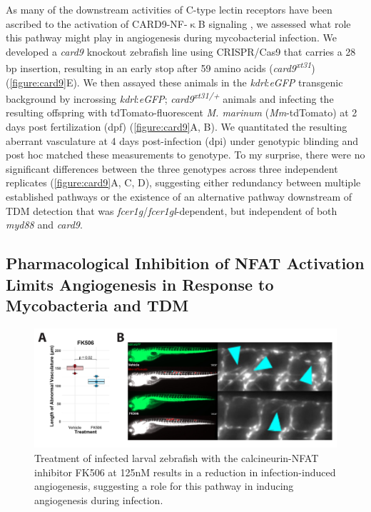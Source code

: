 As many of the downstream activities of C-type lectin receptors have been ascribed to the activation of CARD9-NF-$\upkappa$B signaling \citep{Goodridge2009, LobatoPascual2013, Zhao2014, Williams2017, Deerhake2021}, we assessed what role this pathway might play in angiogenesis during mycobacterial infection. We developed a \textit{card9} knockout zebrafish line using CRISPR/Cas9 that carries a 28 bp insertion, resulting in an early stop after 59 amino acids (\textit{card9\textsuperscript{xt31}}) (\autoref{figure:card9}E). We then assayed these animals in the \textit{kdrl}:\textit{eGFP} transgenic background by incrossing \textit{kdrl}:\textit{eGFP}; \textit{card9\textsuperscript{xt31/+}} animals and infecting the resulting offspring with tdTomato-fluorescent \textit{M. marinum} (\textit{Mm}-tdTomato) at 2 days post fertilization (dpf) \citep{Jin2005, Oehlers2015}(\autoref{figure:card9}A, B). We quantitated the resulting aberrant vasculature at 4 days post-infection (dpi) under genotypic blinding and post hoc matched these measurements to genotype. To my surprise, there were no significant differences between the three genotypes across three independent replicates (\autoref{figure:card9}A, C, D), suggesting either redundancy between multiple established pathways or the existence of an alternative pathway downstream of TDM detection that was \textit{fcer1g}/\textit{fcer1gl}-dependent, but independent of both \textit{myd88} and \textit{card9}. 

\subsection{Pharmacological Inhibition of NFAT Activation Limits Angiogenesis in Response to Mycobacteria and TDM}

\begin{figure}
\centering
\includegraphics[width=\textwidth]{images/fk506inf.pdf}
\caption{Treatment of infected larval zebrafish with the calcineurin-NFAT inhibitor FK506 at 125nM results in a reduction in infection-induced angiogenesis, suggesting a role for this pathway in inducing angiogenesis during infection.}
\label{figure:fk506inf}
\end{figure}

